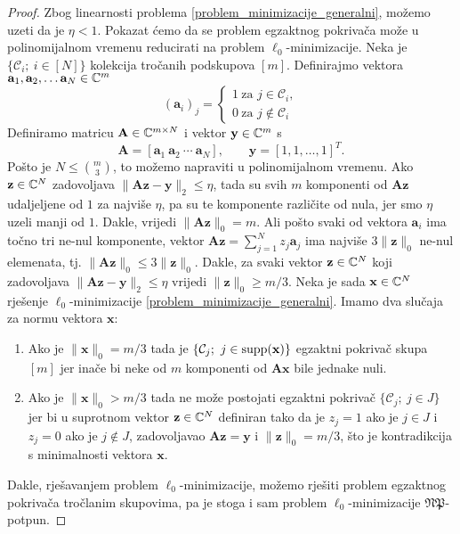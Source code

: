 \documentclass[a4paper,twoside,12pt]{memoir} %
\newcommand{\vect}[1]{\mathbf{#1}}
\renewcommand{\vec}{\vect}
\newcommand{\supp}{\text{\normalfont{supp}}}
\newcommand{\norm}[1]{\|{#1}\|}
\begin{document}
\begin{proof}
    Zbog linearnosti problema \eqref{problem_minimizacije_generalni}, mo\v{z}emo uzeti da je $\eta < 1$. Pokazat \'cemo da se problem egzaktnog pokriva\v{c}a mo\v{z}e u polinomijalnom vremenu reducirati na problem $\ell_0$-minimizacije. Neka je $\{\mathcal{C}_i;\ i \in [N]\}$ kolekcija tro\v{c}anih podskupova $[m]$. Definirajmo vektora $\vec a_1, \vec a_2,\dots \vec a_N \in \C^m$
    \begin{equation*}
        (\vec a_i)_j = 
        \begin{cases*}
            1\ \text{za } j \in \mathcal{C}_i,\\
            0\ \text{za } j \not\in \mathcal{C}_i
        \end{cases*}
    \end{equation*}
    Definiramo matricu $\vec A \in \C^{m \times N}$ i vektor $\vec y \in \C^m$ s
    \begin{equation*}
        \vec A = [\vec a_1\ \vec a_2\ \cdots \ \vec a_N], \qquad \vec y = [1,1, \dots, 1]^T.
    \end{equation*}
    Po\v{s}to je $N \leq {m \choose 3}$, to mo\v{z}emo napraviti u polinomijalnom vremenu. Ako $\vec z \in \C^N$ zadovoljava $\norm{\vec{Az}-\vec y}_2 \leq \eta$, tada su svih $m$ komponenti od $\vec{Az}$ udaljeljene od $1$ za najvi\v{s}e $\eta$, pa su te komponente razli\v{c}ite od nula, jer smo $\eta$ uzeli manji od $1$. Dakle, vrijedi $\norm{\vec{Az}}_0 = m$. Ali po\v{s}to svaki od vektora $\vec a_i$ ima to\v{c}no tri ne-nul komponente, vektor $\vec{Az}=\sum_{j=1}^N z_j \vec a_j$ ima najvi\v{s}e $3 \norm{\vec z}_0$ ne-nul elemenata, tj. $\norm{\vec{Az}}_0 \leq 3 \norm{\vec{z}}_0$. Dakle, za svaki vektor $\vec z \in \C^N$ koji zadovoljava $\norm{\vec{Az}-\vec y}_2 \leq \eta$ vrijedi $\norm{\vec z}_0 \geq m/3$. Neka je sada $\vec x \in \C^N$ rje\v{s}enje $\ell_0$-minimizacije \eqref{problem_minimizacije_generalni}. Imamo dva slu\v{c}aja za normu vektora $\vec x$:
    \begin{enumerate}
        \item Ako je $\norm{\vec{x}}_0 = m/3$ tada je $\{\mathcal{C}_j;\ j \in \supp(\vec x)\}$ egzaktni pokriva\v{c} skupa $[m]$ jer ina\v{c}e bi neke od $m$ komponenti od $\vec{Ax}$ bile jednake nuli.
        \item Ako je $\norm{\vec{x}}_0 > m/3$ tada ne mo\v{z}e postojati egzaktni pokriva\v{c} $\{\mathcal{C}_j;\ j \in J\}$ jer bi u suprotnom vektor $\vec z \in \C^N$ definiran tako da je $z_j = 1$ ako je $j \in J$ i $z_j = 0$ ako je $j \not \in J$, zadovoljavao $\vec{Az}=\vec y$ i $\norm{\vec z}_0=m/3$, \v{s}to je kontradikcija s minimalnosti vektora $\vec x$.
    \end{enumerate}
    Dakle, rje\v{s}avanjem problem $\ell_0$-minimizacije, mo\v{z}emo rje\v{s}iti problem egzaktnog pokriva\v{c}a tro\v{c}lanim skupovima, pa je stoga i sam problem $\ell_0$-minimizacije $\mathfrak{NP}$-potpun.
\end{proof}
\end{document}
